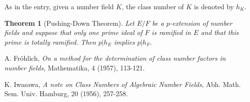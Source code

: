 \documentclass[12pt]{article}
\newtheorem*{thm}{Theorem}
\begin{document}
As in the  entry, given a number field $K$, the class number of $K$ is denoted by $h_K$.

\begin{thm}[Pushing-Down Theorem]
Let $E/F$ be a $p$-extension of number fields and suppose that only one prime ideal of $F$ is ramified in $E$ and that this prime is totally ramified. Then $p|h_E$ implies $p|h_F$.
\end{thm}

\begin{thebibliography}{HGM02} %

A. Fr\"ohlich, \emph{On a method for the determination of class number factors in number fields}, Mathematika, 4 (1957), 113-121.

K. Iwasawa, \emph{A note on Class Numbers of Algebraic Number Fields}, Abh. Math. Sem. Univ. Hamburg, 20 (1956), 257-258.

\end{thebibliography}
\end{document}

